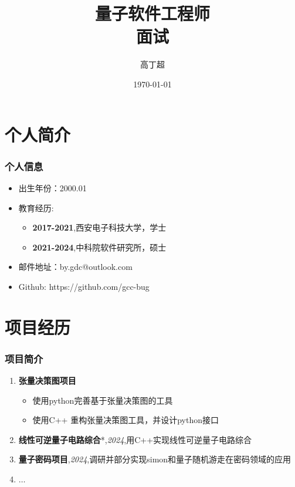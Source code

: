 \documentclass[aspectratio=1610]{beamer}
\title{量子软件工程师\\面试}
\author{高丁超}
\date{\today}
\begin{document}
\frame{\titlepage}
\section{个人简介}
\begin{frame}
\frametitle{个人信息}
\begin{itemize}
    \item 出生年份：2000.01
    \item 教育经历: 
    \begin{itemize}
        \item \textbf{2017-2021},西安电子科技大学，学士
        \item \textbf{2021-2024},中科院软件研究所，硕士
    \end{itemize}
    \item 邮件地址：by.gdc@outlook.com
    \item Github: https://github.com/gcc-bug
\end{itemize}
\end{frame}

\section{项目经历}
\begin{frame}
\frametitle{项目简介}
\begin{enumerate}
    \item \textbf{张量决策图项目} 
    \begin{itemize}
        \item 使用python完善基于张量决策图的工具
        \item 使用C++ 重构张量决策图工具，并设计python接口
    \end{itemize}
    \item \textbf{线性可逆量子电路综合}*,\textit{2024},用C++实现线性可逆量子电路综合
    \item \textbf{量子密码项目},\textit{2024},调研并部分实现simon和量子随机游走在密码领域的应用
    \item \(\dots\)
\end{enumerate}
\end{frame}
\end{document}
